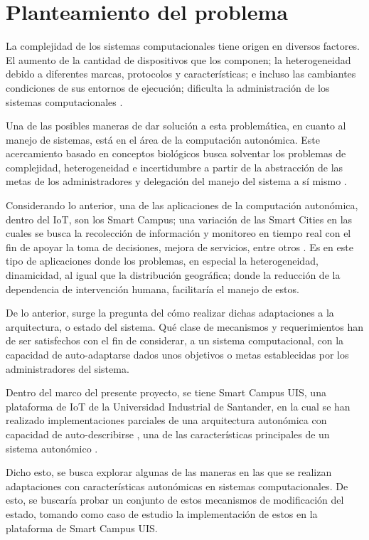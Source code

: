 \section{Planteamiento del problema}

La complejidad de los sistemas computacionales tiene origen en diversos factores. El aumento de la cantidad de dispositivos que los componen; la heterogeneidad debido a diferentes marcas, protocolos y características; e incluso las cambiantes condiciones de sus entornos de ejecución; dificulta la administración de los sistemas computacionales \cite{emerging_2005}.

Una de las posibles maneras de dar solución a esta problemática, en cuanto al manejo de sistemas, está en el área de la computación autonómica. Este acercamiento basado en conceptos biológicos busca solventar los problemas de complejidad, heterogeneidad e incertidumbre \cite{emerging_2005} a partir de la abstracción de las metas de los administradores y delegación del manejo del sistema a sí mismo \cite{lalanda_diaconescu_mccann_2014}.

Considerando lo anterior, una de las aplicaciones de la computación autonómica, dentro del IoT, son los Smart Campus; una variación de las Smart Cities en las cuales se busca la recolección de información y monitoreo en tiempo real con el fin de apoyar la toma de decisiones, mejora de servicios, entre otros \cite{MinAllah2020}. Es en este tipo de aplicaciones donde los problemas, en especial la heterogeneidad, dinamicidad, al igual que la distribución geográfica; donde la reducción de la dependencia de intervención humana, facilitaría el manejo de estos. 

De lo anterior, surge la pregunta del cómo realizar dichas adaptaciones a la arquitectura, o estado del sistema. Qué clase de mecanismos y requerimientos han de ser satisfechos con el fin de considerar, a un sistema computacional, con la capacidad de auto-adaptarse dados unos objetivos o metas establecidas por los administradores del sistema.

Dentro del marco del presente proyecto, se tiene Smart Campus UIS, una plataforma de IoT de la Universidad Industrial de Santander, en la cual se han realizado implementaciones parciales de una arquitectura autonómica con capacidad de auto-describirse \cite{msc_henry_2022}, una de las características principales de un sistema autonómico \cite{horn_2001}. 

Dicho esto, se busca explorar algunas de las maneras en las que se realizan adaptaciones con características autonómicas en sistemas computacionales. De esto, se buscaría probar un conjunto de estos mecanismos de modificación del estado, tomando como caso de estudio la implementación de estos en la plataforma de Smart Campus UIS.